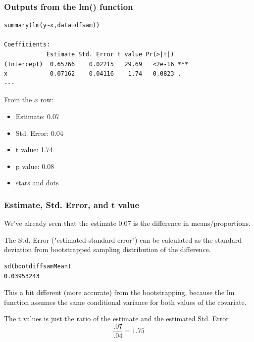 \documentclass{beamer}
\newcommand{\0}{\mathbf{0}}
\begin{document}
\begin{frame}[fragile]

\frametitle{Outputs from the lm() function}
\small
\begin{verbatim}
summary(lm(y~x,data=dfsam))

Coefficients:
            Estimate Std. Error t value Pr(>|t|)    
(Intercept)  0.65766    0.02215   29.69   <2e-16 ***
x            0.07162    0.04116    1.74   0.0823 .  
---
\end{verbatim}

From the $x$ row:
\begin{itemize}
\item Estimate: 0.07
\item Std. Error: 0.04
\item t value: 1.74
\item p value: 0.08
\item stars and dots
\end{itemize}

\end{frame}

\begin{frame}[fragile]
\frametitle{Estimate, Std. Error, and t value}

We've already seen that the estimate 0.07 is the difference in means/proportions.\\ \pause

\bigskip

The Std. Error ("estimated standard error") can be calculated as the standard deviation from bootstrapped sampling distribution of the difference.

\begin{verbatim}
sd(bootdiffsamMean)
0.03953243
\end{verbatim} \pause
This a bit different (more accurate) from the bootstrapping, because the lm function assumes the same conditional variance for both values of the covariate. \pause


\bigskip

The t values is just the ratio of the estimate and the estimated Std. Error
$$
\frac{.07}{.04} = 1.75
$$

\end{frame}
\end{document}
